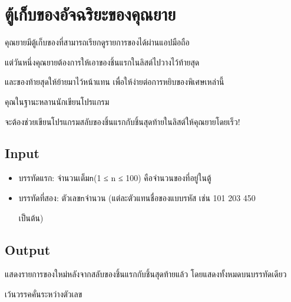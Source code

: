\documentclass{article}
\begin{document}
\section*{ตู้เก็บของอัจฉริยะของคุณยาย}

คุณยายมีตู้เก็บของที่สามารถเรียกดูรายการของได้ผ่านแอปมือถือ

แต่วันหนึ่งคุณยายต้องการให้เอาของชิ้นแรกในลิสต์ไปวางไว้ท้ายสุด



และของท้ายสุดให้ย้ายมาไว้หน้าแทน เพื่อให้ง่ายต่อการหยิบของพิเศษเหล่านี้



คุณในฐานะหลานนักเขียนโปรแกรม

จะต้องช่วยเขียนโปรแกรมสลับของชิ้นแรกกับชิ้นสุดท้ายในลิสต์ให้คุณยายโดยเร็ว!



\subsection*{Input}
\begin{itemize}

\item

  บรรทัดแรก: จำนวนเต็ม\texttt{n}(1 ≤ n ≤ 100) คือจำนวนของที่อยู่ในตู้

\item

  บรรทัดที่สอง: ตัวเลข\texttt{n}จำนวน (แต่ละตัวแทนชื่อของแบบรหัส เช่น 101 203 450

  เป็นต้น)

\end{itemize}



\subsection*{Output}
{แสดงรายการของใหม่หลังจากสลับของชิ้นแรกกับชิ้นสุดท้ายแล้ว โดยแสดงทั้งหมดบนบรรทัดเดียว

เว้นวรรคคั่นระหว่างตัวเลข}\\
\end{document}
